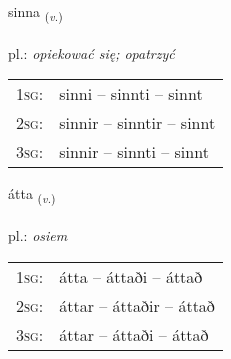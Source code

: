 \documentclass[frontgrid, backgrid]{flacards}\usepackage[]{graphicx}\usepackage[]{xcolor}
\begin{document}
\renewcommand{\flhead}{\vskip5pt \fboxsep=0pt {\small\bfseries\footnotesize Sagnorð | czasownik}}
\renewcommand{\fcfoot}{\vskip5pt \fboxsep=0pt \hspace{2pt}{\small\bfseries\footnotesize 1K}}

\renewcommand{\blhead}{\vskip5pt {\small\bfseries\footnotesize Sagnorð | czasownik }}
\renewcommand{\bcfoot}{\vskip5pt \hspace{2pt}{\small\bfseries\footnotesize 1K}}


{sinna \small{\textsubscript{(\textit{v.})}} \\[1ex] %
\textphonetic{[sɪna]} \\
pl.: \emph{opiekować się; opatrzyć} \\  [2ex]
\renewcommand*{\arraystretch}{0.8}
\begin{tabular}{p{1cm}l}
\textsc{1sg}: & sinni -- sinnti -- sinnt \\ 
\textsc{2sg}: & sinnir -- sinntir -- sinnt \\ 
\textsc{3sg}: & sinnir -- sinnti -- sinnt \\ 
\end{tabular}
}

\renewcommand{\flhead}{\vskip5pt \fboxsep=0pt {\small\bfseries\footnotesize Sagnorð | czasownik}}
\renewcommand{\fcfoot}{\vskip5pt \fboxsep=0pt \hspace{2pt}{\small\bfseries\footnotesize 1K}}

\renewcommand{\blhead}{\vskip5pt {\small\bfseries\footnotesize Sagnorð | czasownik }}
\renewcommand{\bcfoot}{\vskip5pt \hspace{2pt}{\small\bfseries\footnotesize 1K}}


{átta \small{\textsubscript{(\textit{v.})}} \\[1ex] %
\textphonetic{[auhta]} \\
pl.: \emph{osiem} \\  [2ex]
\renewcommand*{\arraystretch}{0.8}
\begin{tabular}{p{1cm}l}
\textsc{1sg}: & átta -- áttaði -- áttað \\ 
\textsc{2sg}: & áttar -- áttaðir -- áttað \\ 
\textsc{3sg}: & áttar -- áttaði -- áttað \\ 
\end{tabular}
}
\end{document}
